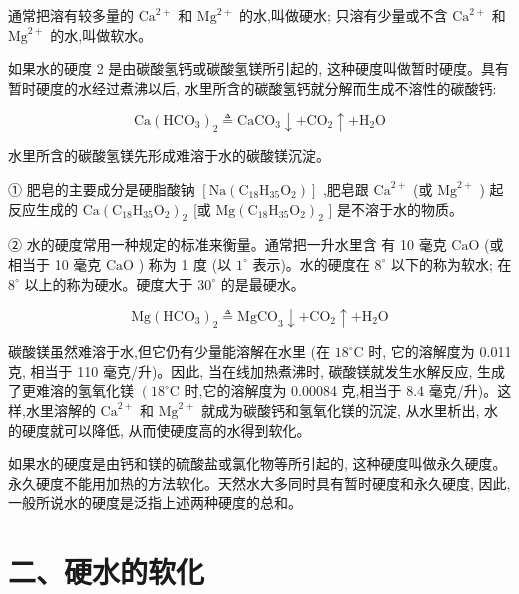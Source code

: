 \documentclass[10pt]{article}
\begin{document}
通常把溶有较多量的 \({\mathrm{{Ca}}}^{2 + }\) 和 \({\mathrm{{Mg}}}^{2 + }\) 的水,叫做硬水; 只溶有少量或不含 \({\mathrm{{Ca}}}^{2 + }\) 和 \({\mathrm{{Mg}}}^{2 + }\) 的水,叫做软水。

如果水的硬度 2 是由碳酸氢钙或碳酸氢镁所引起的, 这种硬度叫做暂时硬度。具有暂时硬度的水经过煮沸以后, 水里所含的碳酸氢钙就分解而生成不溶性的碳酸钙:

\[
\mathrm{{Ca}}{\left( {\mathrm{{HCO}}}_{3}\right) }_{2} \triangleq {\mathrm{{CaCO}}}_{3} \downarrow + {\mathrm{{CO}}}_{2} \uparrow + {\mathrm{H}}_{2}\mathrm{O}
\]

水里所含的碳酸氢镁先形成难溶于水的碳酸镁沉淀。

① 肥皂的主要成分是硬脂酸钠 \(\left\lbrack {\mathrm{{Na}}\left( {{\mathrm{C}}_{18}{\mathrm{H}}_{35}{\mathrm{O}}_{2}}\right) }\right\rbrack\) ,肥皂跟 \({\mathrm{{Ca}}}^{2 + }\) (或 \({\mathrm{{Mg}}}^{2 + }\) ) 起反应生成的 \(\mathrm{{Ca}}{\left( {\mathrm{C}}_{18}{\mathrm{H}}_{35}{\mathrm{O}}_{2}\right) }_{2}\) [或 \(\mathrm{{Mg}}{\left( {\mathrm{C}}_{18}{\mathrm{H}}_{35}{\mathrm{O}}_{2}\right) }_{2}\) ] 是不溶于水的物质。

② 水的硬度常用一种规定的标准来衡量。通常把一升水里含 有 10 毫克 \(\mathrm{{CaO}}\) (或相当于 10 毫克 \(\mathrm{{CaO}}\) ) 称为 1 度 (以 \({1}^{ \circ }\) 表示)。水的硬度在 \({8}^{ \circ }\) 以下的称为软水; 在 \({8}^{ \circ }\) 以上的称为硬水。硬度大于 \({30}^{ \circ }\) 的是最硬水。

\[
\mathrm{{Mg}}{\left( {\mathrm{{HCO}}}_{3}\right) }_{2} \triangleq {\mathrm{{MgCO}}}_{3} \downarrow + {\mathrm{{CO}}}_{2} \uparrow + {\mathrm{H}}_{2}\mathrm{O}
\]

碳酸镁虽然难溶于水,但它仍有少量能溶解在水里 (在 \({18}^{ \circ }\mathrm{C}\) 时, 它的溶解度为 0.011 克, 相当于 110 毫克/升)。因此, 当在线加热煮沸时, 碳酸镁就发生水解反应, 生成了更难溶的氢氧化镁 \(\left( {{18}^{ \circ }\mathrm{C}}\right.\) 时,它的溶解度为 0.00084 克,相当于 8.4 毫克/升)。这样,水里溶解的 \({\mathrm{{Ca}}}^{2 + }\) 和 \({\mathrm{{Mg}}}^{2 + }\) 就成为碳酸钙和氢氧化镁的沉淀, 从水里析出, 水的硬度就可以降低, 从而使硬度高的水得到软化。

如果水的硬度是由钙和镁的硫酸盐或氯化物等所引起的, 这种硬度叫做永久硬度。永久硬度不能用加热的方法软化。天然水大多同时具有暂时硬度和永久硬度, 因此, 一般所说水的硬度是泛指上述两种硬度的总和。

\section*{二、硬水的软化}
\end{document}
